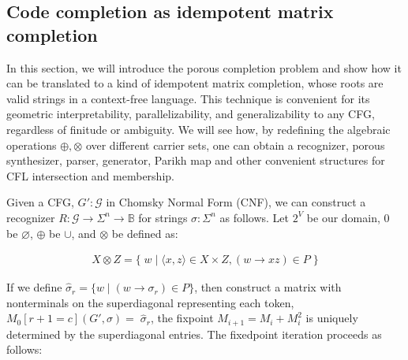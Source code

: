 \documentclass[sigplan,acmsmall,nonacm,screen]{acmart}\settopmatter{printfolios=false,printccs=false,printacmref=false}
\begin{document}
  \subsection{Code completion as idempotent matrix completion}\label{sec:matrix_completion}

  In this section, we will introduce the porous completion problem and show how it can be translated to a kind of idempotent matrix completion, whose roots are valid strings in a context-free language. This technique is convenient for its geometric interpretability, parallelizability, and generalizability to any CFG, regardless of finitude or ambiguity. We will see how, by redefining the algebraic operations $\oplus, \otimes$ over different carrier sets, one can obtain a recognizer, porous synthesizer, parser, generator, Parikh map and other convenient structures for CFL intersection and membership.

  Given a CFG, $G' : \mathcal{G}$ in Chomsky Normal Form (CNF), we can construct a recognizer $R: \mathcal{G} \rightarrow \Sigma^n \rightarrow \mathbb{B}$ for strings $\sigma: \Sigma^n$ as follows. Let $2^V$ be our domain, $0$ be $\varnothing$, $\oplus$ be $\cup$, and $\otimes$ be defined as:\vspace{-10pt}

  \begin{align}
    X \otimes Z = \big\{\;w \mid \langle x, z\rangle \in X \times Z, (w\rightarrow xz) \in P\;\big\}
  \end{align}

  \noindent If we define $\hat\sigma_r = \{w \mid (w \rightarrow \sigma_r) \in P\}$, then construct a matrix with nonterminals on the superdiagonal representing each token, $M_0[r+1=c](G', \sigma) = \;\hat\sigma_r$, the fixpoint $M_{i+1} = M_i + M_i^2$ is uniquely determined by the superdiagonal entries. The fixedpoint iteration proceeds as follows:\vspace{-10pt}
\end{document}
